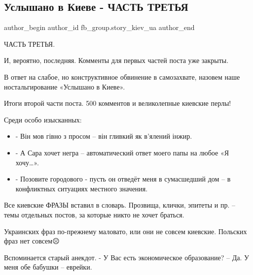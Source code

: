  
 
 
 
 
 
\subsection{Услышано в Киеве - ЧАСТЬ ТРЕТЬЯ}
\label{sec:21_07_2021.fb.fb_group.story_kiev_ua.1.uslyshano_v_kieve_3}
 
\ifcmt
 author_begin
   author_id fb_group.story_kiev_ua
 author_end
\fi

ЧАСТЬ ТРЕТЬЯ. 

И, вероятно, последняя.  Комменты для первых частей поста уже закрыты.

В ответ на слабое, но конструктивное обвинение в самозахвате, назовем наше ностальгирование «Услышано в Киеве». 

Итоги второй части поста. 500 комментов и великолепные киевские перлы!

Среди особо изысканных: 

\begin{itemize}
  \item - Він мов гівно з просом – він гливкий як в’ялений інжир. 
  \item - А Сара хочет негра – автоматический ответ моего папы на любое «Я хочу…».
  \item - Позовите городового - пусть он отведёт меня в сумасшедший дом – в конфликтных ситуациях местного значения.
\end{itemize}

Все киевские ФРАЗЫ вставил в словарь. Прозвища, клички, эпитеты и пр.  – темы отдельных постов, за которые никто не хочет браться. 

Украинских фраз по-прежнему маловато, или они не совсем киевские. Польских фраз нет совсем☹ 

Вспоминается старый анекдот. - У Вас есть экономическое образование? – Да. У меня обе бабушки – еврейки.

